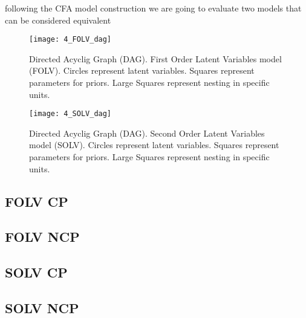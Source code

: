 following the CFA model construction we are going to evaluate two models that can be considered equivalent 
%
\begin{figure}[h]
	\centering
	\texttt{[image: 4\_FOLV\_dag]}
	\caption[Directed Acyclig Graph (DAG). First Order Latent Variables model (FOLV).]%
	{Directed Acyclig Graph (DAG). First Order Latent Variables model (FOLV). Circles represent latent variables. Squares represent parameters for priors. Large Squares represent nesting in specific units.}
	\label{fig:FOLV_model}
\end{figure}
%
\begin{figure}[h]
	\centering
	\texttt{[image: 4\_SOLV\_dag]}
	\caption[Directed Acyclic Graph (DAG). Second Order Latent Variables model (SOLV).]%
	{Directed Acyclig Graph (DAG). Second Order Latent Variables model (SOLV). Circles represent latent variables. Squares represent parameters for priors. Large Squares represent nesting in specific units.}
	\label{fig:SOLV_model}
\end{figure}

\subsection{FOLV CP}

\subsection{FOLV NCP}

\subsection{SOLV CP}

\subsection{SOLV NCP}

